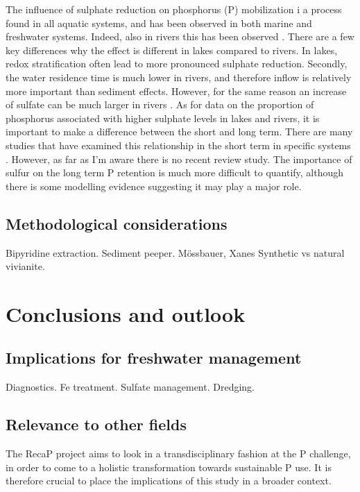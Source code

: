 \documentclass[12pt,twoside]{book}
\begin{document}
The influence of sulphate reduction on phosphorus (P) mobilization i a process found in all aquatic systems, and has been observed in both marine and freshwater systems. Indeed, also in rivers this has been observed \citep{Zak2006}. There are a few key differences why the effect is different in lakes compared to rivers. In lakes, redox stratification often lead to more pronounced sulphate reduction. Secondly, the water residence time is much lower in rivers, and therefore inflow is relatively more important than sediment effects. However, for the same reason an increase of sulfate can be much larger in rivers \citep{Kommana2023}.
As for data on the proportion of phosphorus associated with higher sulphate levels in lakes and rivers, it is important to make a difference between the short and long term. There are many studies that have examined this relationship in the short term in specific systems \citep[e.g.][]{Roden1997, Chen2016, Zhao2021} . However, as far as I'm aware there is no recent review study. The importance of sulfur on the long term P retention is much more difficult to quantify, although there is some modelling evidence \citep{Katsev2006} suggesting it may play a major role.

\subsection{Methodological considerations}\label{methodological-considerations}

Bipyridine extraction.
Sediment peeper.
Mössbauer, Xanes
Synthetic vs natural vivianite.

\section{Conclusions and outlook}\label{conclusions-and-outlook}

\subsection{Implications for freshwater management}\label{implications-for-freshwater-management}

Diagnostics.
Fe treatment.
Sulfate management.
Dredging.

\subsection{Relevance to other fields}\label{relevance-to-other-fields}

The RecaP project aims to look in a transdisciplinary fashion at the P challenge, in order to come to a holistic transformation towards sustainable P use. It is therefore crucial to place the implications of this study in a broader context.
\end{document}
